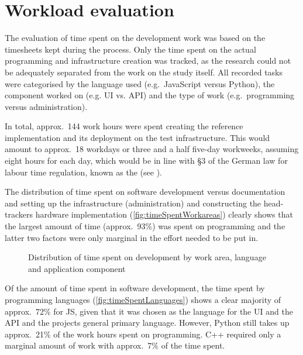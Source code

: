 \section{Workload evaluation}\label{sec:workload-evaluation}

The evaluation of time spent on the development work was based on the timesheets kept during the process.
Only the time spent on the actual programming and infrastructure creation was tracked, as the research could not be adequately separated from the work on the study itself.
All recorded tasks were categorised by the language used (e.g.\ JavaScript versus Python), the component worked on (e.g. \ac{UI} vs. \ac{API}) and the type of work (e.g.\ programming versus administration).

In total, approx.~144 work hours were spent creating the reference implementation and its deployment on the test infrastructure.
This would amount to approx.~18 workdays or three and a half five-day workweeks, assuming eight hours for each day, which would be in line with §3 of the German law for labour time regulation, known as the  (see \parencite{abzgPar3}).

The distribution of time spent on software development versus documentation and setting up the infrastructure (administration) and constructing the head-tracker\textquotesingle s hardware implementation (\autoref{fig:timeSpentWorkareas}) clearly shows that the largest amount of time (approx.~93\%) was spent on programming and the latter two factors were only marginal in the effort needed to be put in.

\begin{figure*}[!ht]
\centering

\caption[Distribution of time spent on development]{Distribution of time spent on development by work area, language and application component\protect}
\label{fig:timeSpentWorkareas}
\end{figure*}

Of the amount of time spent in software development, the time spent by programming languages (\autoref{fig:timeSpentLanguages}) shows a clear majority of approx.~72\% for \ac{JS}, given that it was chosen as the language for the \ac{UI} and the \ac{API} and the project\textquotesingle s general primary language.
However, Python still takes up approx.~21\% of the work hours spent on programming.
C++ required only a marginal amount of work with approx.~7\% of the time spent.

